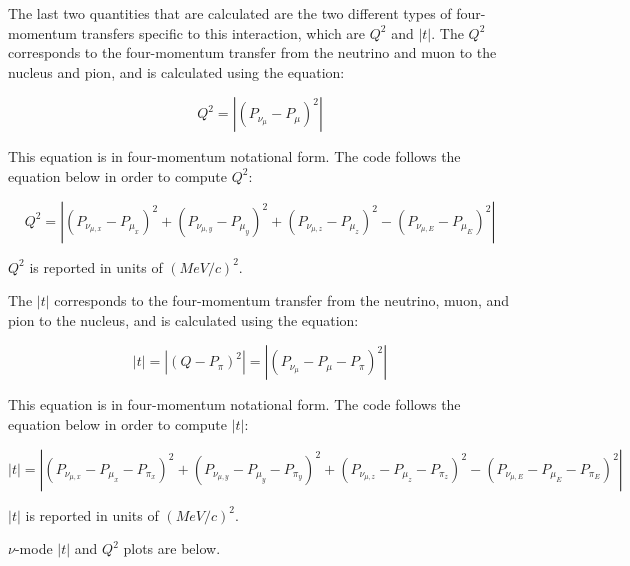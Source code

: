 \documentclass[11pt]{article}
\begin{document}
The last two quantities that are calculated are the two different types of four-momentum transfers specific to this interaction, which are $Q^2$ and $|t|$. The $Q^2$ corresponds to the four-momentum transfer from the neutrino and muon to the nucleus and pion, and is calculated using the equation:

\begin{equation}
Q^2 = |(P_{\nu_\mu} - P_\mu)^2|
\end{equation}

\noindent
This equation is in four-momentum notational form. The code follows the equation below in order to compute $Q^2$:

\begin{equation}
Q^2 = |(P_{\nu_{\mu,x}} - P_{\mu_x})^2 + (P_{\nu_{\mu,y}} - P_{\mu_y})^2 + (P_{\nu_{\mu,z}} - P_{\mu_z})^2 - (P_{\nu_{\mu,E}} - P_{\mu_E})^2|
\end{equation}

\noindent
$Q^2$ is reported in units of $(MeV/c)^2$.

The $|t|$ corresponds to the four-momentum transfer from the neutrino, muon, and pion to the nucleus, and is calculated using the equation:

\begin{equation}
|t| = |(Q - P_\pi)^2| = |(P_{\nu_\mu} - P_\mu - P_\pi)^2|
\end{equation}

\noindent
This equation is in four-momentum notational form. The code follows the equation below in order to compute $|t|$:

\begin{equation}
|t| = |(P_{\nu_{\mu,x}} - P_{\mu_x} - P_{\pi_x})^2 + (P_{\nu_{\mu,y}} - P_{\mu_y} - P_{\pi_y})^2 + (P_{\nu_{\mu,z}} - P_{\mu_z} - P_{\pi_z})^2 - (P_{\nu_{\mu,E}} - P_{\mu_E} - P_{\pi_E})^2|
\end{equation}

\noindent
$|t|$ is reported in units of $(MeV/c)^2$.


$\nu$-mode $|t|$ and $Q^2$ plots are below.
\end{document}
